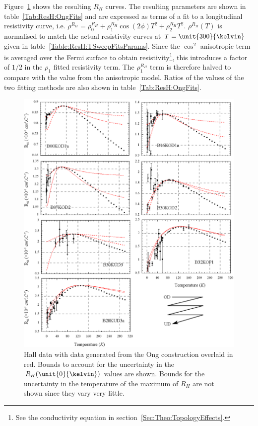 Figure~\ref{Fig:ResH:OngFits} shows the resulting $R_H$ curves. The resulting parameters are shown in table~\ref{Tab:ResH:OngFits} and are expressed as terms of a fit to a longitudinal resistivity curve, i.e. $\rho^{R_H} = \rho_0^{R_H} + \rho_1^{R_H}\cos(2\phi)T^2 + \rho_2^{R_H} T^2$. $\rho^{R_H}(T)$ is normalised to match the actual resistivity curves at $T=\unit{300}{\kelvin}$ given in table~\ref{Table:ResH:TSweepFitsParams}. Since the $\cos^2$ anisotropic term is averaged over the Fermi surface to obtain resistivity\footnote{See the conductivity equation in section~\ref{Sec:Theo:TopologyEffects}.}, this introduces a factor of $1/2$ in the $\rho_1$ fitted resistivity term. The $\rho^{R_H}_1$ term is therefore halved to compare with the value from the anisotropic model. Ratios of the values of the two fitting methods are also shown in table~\ref{Tab:ResH:OngFits}.
\begin{figure}[htbp]
    \begin{center}
        \includegraphics[scale=0.9]{Chapter-HallBSCO/Figures/OngFits/OngFits}
        \caption{Hall data with data generated from the Ong construction overlaid in red. Bounds to account for the uncertainty in the $R_H(\unit{0}{\kelvin})$ values are shown. Bounds for the uncertainty in the temperature of the maximum of $R_H$ are not shown since they vary very little.}
        \label{Fig:ResH:OngFits}
    \end{center}
\end{figure}

